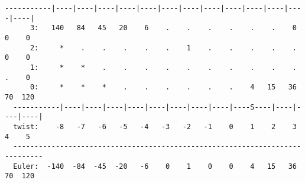 \documentclass[a4paper,11pt]{report}
\begin{document}
{{{\begin{Verbatim}[commandchars=!@C,fontsize=\small,frame=single,label=Example]
  -----------|----|----|----|----|----|----|----|----|----|----|----|----|----|
      3:   140   84   45   20    6    .    .    .    .    .    .    0    0    0
      2:     *    .    .    .    .    .    1    .    .    .    .    .    0    0
      1:     *    *    .    .    .    .    .    .    .    .    .    .    .    0
      0:     *    *    *    .    .    .    .    .    .    4   15   36   70  120
  -----------|----|----|----|----|----|----|----|----|----S----|----|----|----|
  twist:    -8   -7   -6   -5   -4   -3   -2   -1    0    1    2    3    4    5
  -----------------------------------------------------------------------------
  Euler:  -140  -84  -45  -20   -6    0    1    0    0    4   15   36   70  120
\end{Verbatim}
 }

 }

  }

   
\end{document}

